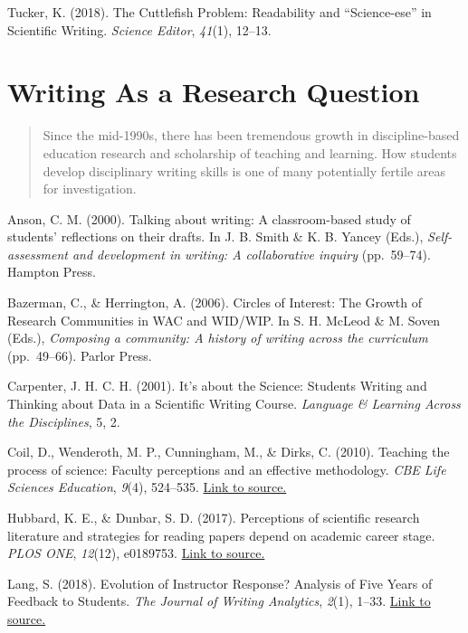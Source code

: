 \documentclass[
]{book}
\begin{document}
Tucker, K. (2018). The Cuttlefish Problem: Readability and ``Science-ese'' in Scientific Writing. \emph{Science Editor}, \emph{41}(1), 12--13.

\hypertarget{writing-as-a-research-question}{%
\section{Writing As a Research Question}\label{writing-as-a-research-question}}

\begin{quote}
Since the mid-1990s, there has been tremendous growth in discipline-based education research and scholarship of teaching and learning. How students develop disciplinary writing skills is one of many potentially fertile areas for investigation.
\end{quote}

Anson, C. M. (2000). Talking about writing: A classroom-based study of students' reflections on their drafts. In J. B. Smith \& K. B. Yancey (Eds.), \emph{Self-assessment and development in writing: A collaborative inquiry} (pp.~59--74). Hampton Press.

Bazerman, C., \& Herrington, A. (2006). Circles of Interest: The Growth of Research Communities in WAC and WID/WIP. In S. H. McLeod \& M. Soven (Eds.), \emph{Composing a community: A history of writing across the curriculum} (pp.~49--66). Parlor Press.

Carpenter, J. H. C. H. (2001). It's about the Science: Students Writing and Thinking about Data in a Scientific Writing Course. \emph{Language \& Learning Across the Disciplines}, 5, 2.

Coil, D., Wenderoth, M. P., Cunningham, M., \& Dirks, C. (2010). Teaching the process of science: Faculty perceptions and an effective methodology. \emph{CBE Life Sciences Education}, \emph{9}(4), 524--535. \href{https://doi.org/10.1187/cbe.10-01-0005}{Link to source.}

Hubbard, K. E., \& Dunbar, S. D. (2017). Perceptions of scientific research literature and strategies for reading papers depend on academic career stage. \emph{PLOS ONE}, \emph{12}(12), e0189753. \href{https://doi.org/10.1371/journal.pone.0189753}{Link to source.}

Lang, S. (2018). Evolution of Instructor Response? Analysis of Five Years of Feedback to Students. \emph{The Journal of Writing Analytics}, \emph{2}(1), 1--33. \href{https://doi.org/10.37514/JWA-J.2018.2.1.02}{Link to source.}
\end{document}
